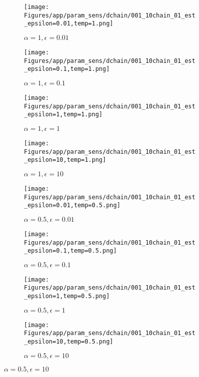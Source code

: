 \documentclass{article}
\theoremstyle{plain}
\begin{document}
\begin{appendices}
\begin{figure}
                \begin{subfigure}[b]{0.24\textwidth}
                    \centering
                    \texttt{[image: Figures/app/param\_sens/dchain/001\_10chain\_01\_est\_epsilon=0.01,temp=1.png]}
                    \caption*{$\alpha=1,\epsilon=0.01$}
                \end{subfigure}
                \begin{subfigure}[b]{0.24\textwidth}
                    \centering
                    \texttt{[image: Figures/app/param\_sens/dchain/001\_10chain\_01\_est\_epsilon=0.1,temp=1.png]}
                    \caption*{$\alpha=1,\epsilon=0.1$}
                \end{subfigure}
                \begin{subfigure}[b]{0.24\textwidth}
                    \centering
                    \texttt{[image: Figures/app/param\_sens/dchain/001\_10chain\_01\_est\_epsilon=1,temp=1.png]}
                    \caption*{$\alpha=1,\epsilon=1$}
                \end{subfigure}
                \begin{subfigure}[b]{0.24\textwidth}
                    \centering
                    \texttt{[image: Figures/app/param\_sens/dchain/001\_10chain\_01\_est\_epsilon=10,temp=1.png]}
                    \caption*{$\alpha=1,\epsilon=10$}
                \end{subfigure}
                
                \begin{subfigure}[b]{0.24\textwidth}
                    \centering
                    \texttt{[image: Figures/app/param\_sens/dchain/001\_10chain\_01\_est\_epsilon=0.01,temp=0.5.png]}
                    \caption*{$\alpha=0.5,\epsilon=0.01$}
                \end{subfigure}
                \begin{subfigure}[b]{0.24\textwidth}
                    \centering
                    \texttt{[image: Figures/app/param\_sens/dchain/001\_10chain\_01\_est\_epsilon=0.1,temp=0.5.png]}
                    \caption*{$\alpha=0.5,\epsilon=0.1$}
                \end{subfigure}
                \begin{subfigure}[b]{0.24\textwidth}
                    \centering
                    \texttt{[image: Figures/app/param\_sens/dchain/001\_10chain\_01\_est\_epsilon=1,temp=0.5.png]}
                    \caption*{$\alpha=0.5,\epsilon=1$}
                \end{subfigure}
                \begin{subfigure}[b]{0.24\textwidth}
                    \centering
                    \texttt{[image: Figures/app/param\_sens/dchain/001\_10chain\_01\_est\_epsilon=10,temp=0.5.png]}
                    \caption*{$\alpha=0.5,\epsilon=10$}
                \end{subfigure}
                

\end{figure}
\end{appendices}
\end{document}
